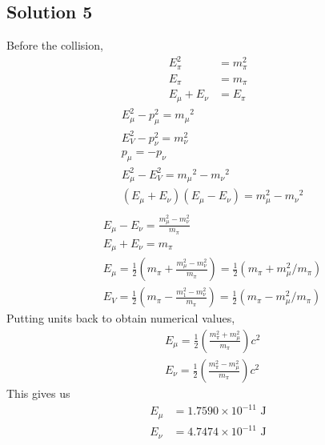\documentclass{article}
\begin{document}
\subsection{Solution 5}
Before the collision,
\begin{equation}
	\begin{aligned}
		E_{\pi}^{2} &=m_{\pi}^{2} \\
		E_{\pi} &=m_{\pi} \\
		E_{\mu}+E_{\nu} &=E_{\pi}
	\end{aligned}
\end{equation}
\begin{equation}
	\begin{aligned}
		&E_{\mu}^{2}-p_{\mu}^{2}=m_{\mu}{ }^{2}\\
		&E_{V}^{2}-p_{\nu}^{2}=m_{\nu}^{2}\\
		&p_{\mu}=-p_\nu\\
		&E_{\mu}^{2}-E_{V}^{2}=m_{\mu}{ }^{2}-m_{\nu}{ }^{2}\\
		&\left(E_{\mu}+E_{\nu}\right)\left(E_{\mu}-{E_\nu}\right)=m_{\mu}^{2}-m_{\nu}{ }^{2}\\
	\end{aligned}
\end{equation}
\begin{equation}
	\begin{aligned}
		&E_{\mu}-E_{\nu}=\frac{m_{\mu}^{2}-m_{\nu}^2}{m_{\pi}} \\
		&E_{\mu}+E_{\nu}=m_{\pi} \\
		&E_{\mu}=\frac{1}{2}\left(m_{\pi}+\frac{m_{\mu}^{2}-m_{\nu}^2}{m_{\pi}}\right)= \frac{1}{2}\left(m_{\pi}+m_{\mu}^{2} / m_{\pi}\right) \\
		&E_{V}=\frac{1}{2}\left(m_{\pi}-\frac{m_{1}^{2}-m_{\nu}^{2}}{m_{\pi}}\right)=\frac{1}{2}\left(m_{\pi}-m_{\mu}^{2} / m_{\pi}\right)
\end{aligned}
\end{equation}
Putting units back to obtain numerical values,
\begin{equation}
	\begin{aligned}
		&E_{\mu}=\frac{1}{2}\left(\frac{m_{\pi}^{2}+m_{\mu}^{2}}{m_{\pi}}\right) c^{2} \\
		&E_{\nu}=\frac{1}{2}\left(\frac{m_{\pi}^{2}-m_{\mu}^{2}}{m_{\pi}}\right)c^{2}
	\end{aligned}
\end{equation}
This gives us 
\begin{align}
	E_\mu &= 1.7590 \times 10^{-11} \text{ J}\\
	E_\nu &= 4.7474 \times 10^{-11} \text{ J}
\end{align}
\end{document}
